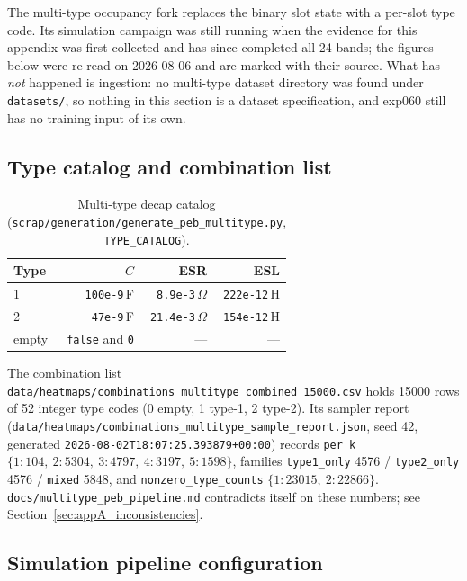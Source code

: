 The multi-type occupancy fork replaces the binary slot state with a per-slot type code. Its
simulation campaign was still running when the evidence for this appendix was first collected and
has since completed all 24 bands; the figures below were re-read on 2026-08-06 and are marked with
their source. What has \emph{not} happened is ingestion: no multi-type dataset directory was found
under \texttt{datasets/}, so nothing in this section is a dataset specification, and exp060 still
has no training input of its own.

\subsection{Type catalog and combination list}
\label{subsec:appA_multitype_catalog}

\begin{table}[htbp]
\centering
\caption{Multi-type decap catalog
(\texttt{scrap/\allowbreak{}generation/\allowbreak{}generate\_\allowbreak{}peb\_\allowbreak{}multitype.py}, \texttt{TYPE\_CATALOG}).}
\label{tab:appA_type_catalog}
\begin{tabular}{l r r r}
\hline
Type & $C$ & ESR & ESL \\
\hline
1 & \texttt{100e-9}\,F & \texttt{8.9e-3}\,$\Omega$ & \texttt{222e-12}\,H \\
2 & \texttt{47e-9}\,F & \texttt{21.4e-3}\,$\Omega$ & \texttt{154e-12}\,H \\
empty & \texttt{false} and \texttt{0} & --- & --- \\
\hline
\end{tabular}
\end{table}

The combination list \texttt{data/\allowbreak{}heatmaps/\allowbreak{}combinations\_\allowbreak{}multitype\_\allowbreak{}combined\_\allowbreak{}15000.csv} holds
15000 rows of 52 integer type codes (0 empty, 1 type-1, 2 type-2). Its sampler report
(\texttt{data/\allowbreak{}heatmaps/\allowbreak{}combinations\_\allowbreak{}multitype\_\allowbreak{}sample\_\allowbreak{}report.json}, seed 42, generated
\texttt{2026-08-02T18:07:25.393879+00:00}) records \texttt{per\_k}
$\{1{:}104,\ 2{:}5304,\ 3{:}4797,\ 4{:}3197,\ 5{:}1598\}$, families \texttt{type1\_only} 4576 /
\texttt{type2\_only} 4576 / \texttt{mixed} 5848, and \texttt{nonzero\_type\_counts}
$\{1{:}23015,\ 2{:}22866\}$. \texttt{docs/multitype\_peb\_pipeline.md} contradicts itself on these
numbers; see Section~\ref{sec:appA_inconsistencies}.

\subsection{Simulation pipeline configuration}
\label{subsec:appA_multitype_pipeline}

